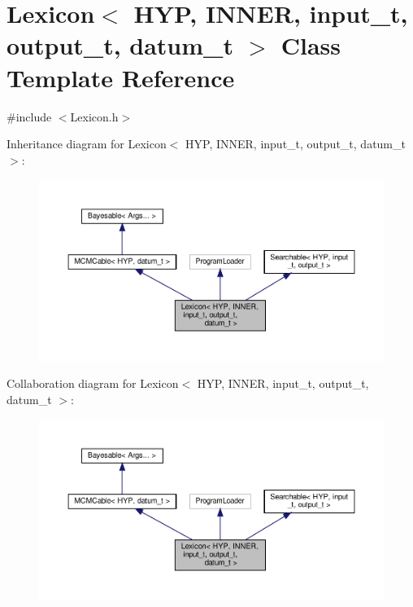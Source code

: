 \hypertarget{class_lexicon}{}\section{Lexicon$<$ H\+YP, I\+N\+N\+ER, input\+\_\+t, output\+\_\+t, datum\+\_\+t $>$ Class Template Reference}
\label{class_lexicon}


{\ttfamily \#include $<$Lexicon.\+h$>$}



Inheritance diagram for Lexicon$<$ H\+YP, I\+N\+N\+ER, input\+\_\+t, output\+\_\+t, datum\+\_\+t $>$\+:
\nopagebreak
\begin{figure}[H]
\begin{center}
\leavevmode
\includegraphics[width=350pt]{class_lexicon__inherit__graph}
\end{center}
\end{figure}


Collaboration diagram for Lexicon$<$ H\+YP, I\+N\+N\+ER, input\+\_\+t, output\+\_\+t, datum\+\_\+t $>$\+:
\nopagebreak
\begin{figure}[H]
\begin{center}
\leavevmode
\includegraphics[width=350pt]{class_lexicon__coll__graph}
\end{center}
\end{figure}
